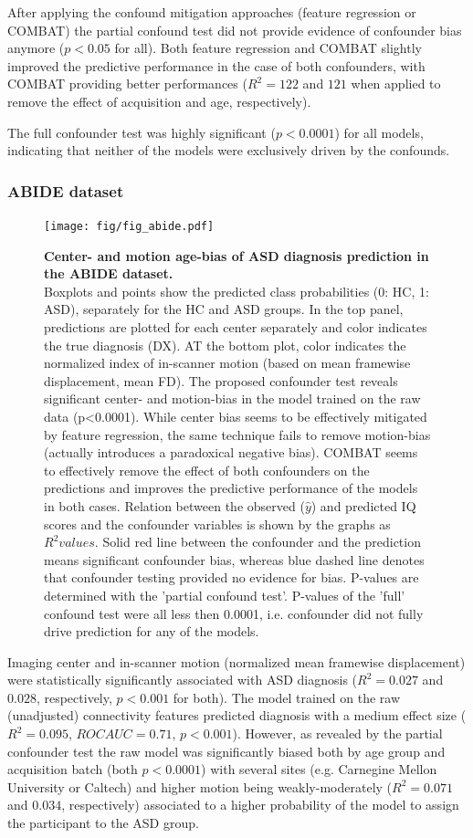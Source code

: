 \documentclass{article}
\begin{document}
After applying the confound mitigation approaches (feature regression or COMBAT) the partial confound test did not provide evidence of confounder bias anymore ($p < 0.05$ for all). Both feature regression and COMBAT slightly improved the predictive performance in the case of both confounders, with COMBAT providing better performances ($R^2=122$ and $121$ when applied to remove the effect of acquisition and age, respectively).

The full confounder test was highly significant ($p<0.0001$) for all models, indicating that neither of the models were exclusively driven by the confounds.

\subsubsection*{ABIDE dataset}

\begin{figure}[!b]
  \centering
  \texttt{[image: fig/fig\_abide.pdf]}
  \caption{\textbf{Center- and motion age-bias of ASD diagnosis prediction in the ABIDE dataset.} \\
  Boxplots and points show the predicted class probabilities (0: HC, 1: ASD), separately for the HC and ASD groups. In the top panel, predictions are plotted for each center separately and color indicates the true diagnosis (DX). AT the bottom plot, color indicates the normalized index of in-scanner motion (based on mean framewise displacement, mean FD). The proposed confounder test reveals significant center- and motion-bias in the model trained on the raw data (p<0.0001). While center bias seems to be effectively mitigated by feature regression, the same technique fails to remove motion-bias (actually introduces a paradoxical negative bias). COMBAT seems to effectively remove the effect of both confounders on the predictions and improves the predictive performance of the models in both cases.
  Relation between the observed ($\hat{y}$) and predicted IQ scores and the confounder variables is shown by the graphs as $R^2 values$. Solid red line between the confounder and the prediction means significant confounder bias, whereas blue dashed line denotes that confounder testing provided no evidence for bias. P-values are determined with the 'partial confound test'. P-values of the 'full' confound test were all less then 0.0001, i.e. confounder did not fully drive prediction for any of the models.
  }
  \label{fig:abide}
\end{figure}

Imaging center and in-scanner motion (normalized mean framewise displacement) were statistically significantly associated with ASD diagnosis ($R^2=0.027$ and $0.028$, respectively, $p<0.001$ for both). The model trained on the raw (unadjusted) connectivity features predicted diagnosis with a medium effect size ($R^2=0.095$, $ROC AUC = 0.71$, $p<0.001$).
However, as revealed by the partial confounder test the raw model was significantly biased both by age group and acquisition batch (both $p<0.0001$) with several sites (e.g. Carnegine Mellon University or Caltech) and higher motion being weakly-moderately ($R^2=0.071$ and $0.034$, respectively) associated to a higher probability of the model to assign the participant to the ASD group.
\end{document}

